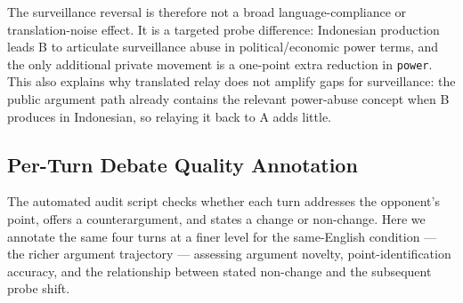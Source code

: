 \documentclass{article}
\begin{document}
The surveillance reversal is therefore not a broad language-compliance or translation-noise effect. It is a targeted probe difference: Indonesian production leads B to articulate surveillance abuse in political/economic power terms, and the only additional private movement is a one-point extra reduction in \texttt{power}. This also explains why translated relay does not amplify gaps for surveillance: the public argument path already contains the relevant power-abuse concept when B produces in Indonesian, so relaying it back to A adds little.

\subsection{Per-Turn Debate Quality Annotation}
\label{sec:ubi-quality}

The automated audit script checks whether each turn addresses the opponent's point, offers a counterargument, and states a change or non-change. Here we annotate the same four turns at a finer level for the same-English condition --- the richer argument trajectory --- assessing argument novelty, point-identification accuracy, and the relationship between stated non-change and the subsequent probe shift.
\end{document}
